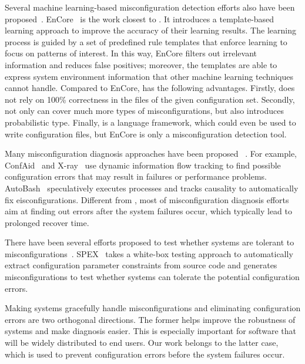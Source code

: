 Several machine learning-based misconfiguration detection efforts 
also have been proposed~\cite{yuan11context, zhang14encore}.
EnCore~\cite{zhang14encore} is the work closest to \app.
It introduces a template-based
learning approach to improve the accuracy of their learning results.
The learning process is guided by a set of predefined rule templates
that enforce learning to focus on patterns of interest.
In this way, EnCore filters out irrelevant information and reduces
false positives; moreover, the templates are able to express
system environment information that other machine learning
techniques cannot handle.
Compared to EnCore, \app has the following advantages.
Firstly, \app does not rely on 100\% correctness in the files of the given configuration set. 
Secondly, \app not only can cover much more types of 
misconfigurations, but also introduces probabilistic type.
Finally, \app is a language framework, which could 
even be used to write configuration files, but EnCore is only a 
misconfiguration detection tool.

Many misconfiguration diagnosis approaches have been proposed%
~\cite{attariyan10automating, attariyan12x-ray}.
For example, ConfAid~\cite{attariyan10automating} 
and X-ray~\cite{attariyan12x-ray} use dynamic information
flow tracking to find possible configuration errors that may result in
failures or performance problems. AutoBash~\cite{su07autobash} 
speculatively
executes processes and tracks causality to automatically fix 
eisconfigurations. Different from \app, most of misconfiguration
diagnosis efforts aim at finding out errors after the system
failures occur, which typically lead to prolonged recover time.

There have been several efforts proposed to test whether systems are 
tolerant to misconfigurations~\cite{xu13do}. 
SPEX~\cite{xu13do} takes a white-box testing approach to automatically
extract configuration parameter constraints from source code and generates 
misconfigurations to test whether systems can tolerate the potential
configuration errors.

Making systems gracefully handle misconfigurations and eliminating
configuration errors are two orthogonal directions.
The former helps improve the robustness of systems and make 
diagnosis easier. This is especially important for 
software that will be widely distributed to end users.
Our work belongs to the latter case, which is used to 
prevent configuration errors before the system failures occur.
